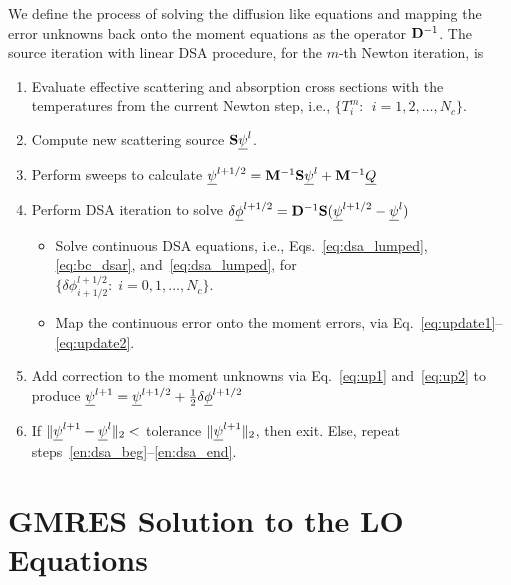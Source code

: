 We define the process of solving the diffusion like equations and mapping the error
unknowns back onto the moment equations as the operator $\mathbf{D}^{-1}$.
The source iteration with linear DSA procedure, for the $m$-th Newton iteration, is
\begin{enumerate}
    \item Evaluate effective scattering and absorption cross sections with the temperatures from the current Newton step, i.e.,
        ${\{T^m_i:\;\, i=1,2,\ldots,N_c\}}$.
    \item\label{en:dsa_beg} Compute new scattering source $\mathbf{S} \underline{\psi}^l$.
    \item Perform sweeps to calculate $\underline{\psi}^{l+1/2} = \mathbf{M}^{-1} \mathbf{S} \underline{\psi}^{l} + \mathbf{M}^{-1} \underline{Q}$
    \item Perform DSA iteration to solve $ \delta \underline{\phi}^{l+1/2} = \mathbf{D}^{-1}
        \mathbf{S}(\underline{\psi}^{l+1/2}-\underline{\psi}^l)$
        \begin{itemize}
    \item Solve continuous DSA equations, i.e., Eqs.~\eqref{eq:dsa_lumped}, \eqref{eq:bc_dsar},
and~\eqref{eq:dsa_lumped}, for \\${\{\delta
            \phi^{l+1/2}_{i+1/2}:\;i=0,1,\ldots,N_c\}}$.
        \item Map the continuous error onto the moment errors, via
            Eq.~\eqref{eq:update1}--\eqref{eq:update2}.
    \end{itemize}
\item Add correction to the moment unknowns via Eq.~\eqref{eq:up1} and~\eqref{eq:up2} to produce $\underline{\psi}^{l+1} = \underline{\psi}^{l+1/2} + \frac{1}{2}\delta \underline{\phi}^{l+1/2}$
    \item\label{en:dsa_end} If $\|\underline{\psi}^{l+1} - \underline{\psi}^{l} \|_2 < $ tolerance $\|\underline{\psi}^{l+1} \|_2$, then
        exit. Else, repeat steps~\ref{en:dsa_beg}--\ref{en:dsa_end}.
\end{enumerate}

\section{GMRES Solution to the LO Equations}


